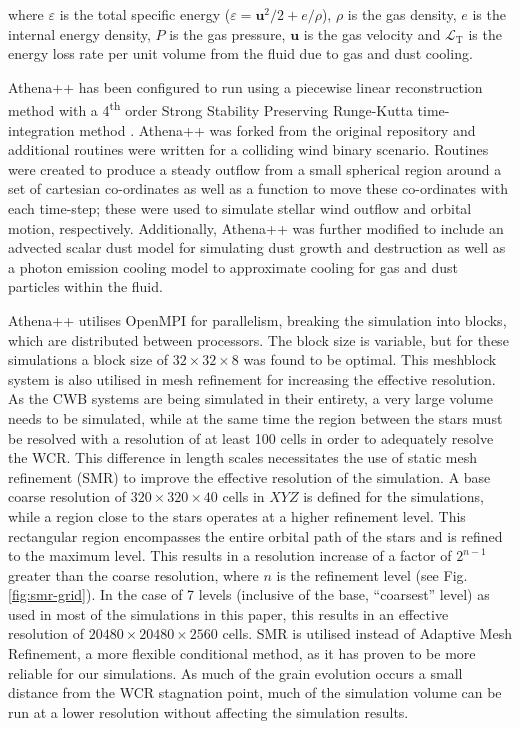 \documentclass[fleqn,usenatbib]{mnras}
\newcommand{\ts}{\textsuperscript}
\newcommand{\rms}[1]{\ensuremath{_{\text{#1}}}}
\begin{document}
\noindent
where $\varepsilon$ is the total specific energy ($\varepsilon = \boldsymbol{u}^2/2 + e/\rho $), $\rho$ is the gas density, $e$ is the internal energy density, $P$ is the gas pressure, $\boldsymbol{u}$ is the gas velocity and $\mathcal{L}\rms{T}$ is the energy loss rate per unit volume from the fluid due to gas and dust cooling.


Athena++ has been configured to run using a piecewise linear reconstruction method with a 4\ts{th} order Strong Stability Preserving Runge-Kutta time-integration method \citep{spiteriNewClassOptimal2002}.
Athena++ was forked from the original repository and additional routines were written for a colliding wind binary scenario.
Routines were created to produce a steady outflow from a small spherical region around a set of cartesian co-ordinates as well as a function to move these co-ordinates with each time-step; these were used to simulate stellar wind outflow and orbital motion, respectively.
Additionally, Athena++ was further modified to include an advected scalar dust model for simulating dust growth and destruction as well as a photon emission cooling model to approximate cooling for gas and dust particles within the fluid.

Athena++ utilises OpenMPI for parallelism, breaking the simulation into blocks, which are distributed between processors.
The block size is variable, but for these simulations a block size of $32\times 32 \times 8$ was found to be optimal.
This meshblock system is also utilised in mesh refinement for increasing the effective resolution.
As the CWB systems are being simulated in their entirety, a very large volume needs to be simulated, while at the same time the region between the stars must be resolved with a resolution of at least 100 cells in order to adequately resolve the WCR.
This difference in length scales necessitates the use of static mesh refinement (SMR) to improve the effective resolution of the simulation.
A base coarse resolution of $320 \times 320 \times 40$ cells in $XYZ$ is defined for the simulations, while a region close to the stars operates at a higher refinement level.
This rectangular region encompasses the entire orbital path of the stars and is refined to the maximum level.
This results in a resolution increase of a factor of $2^{n-1}$ greater than the coarse resolution, where $n$ is the refinement level (see Fig. \ref{fig:smr-grid}).
In the case of 7 levels (inclusive of the base, ``coarsest'' level) as used in most of the simulations in this paper, this results in an effective resolution of $20480 \times 20480 \times 2560$ cells.
SMR is utilised instead of Adaptive Mesh Refinement, a more flexible conditional method, as it has proven to be more reliable for our simulations.
As much of the grain evolution occurs a small distance from the WCR stagnation point, much of the simulation volume can be run at a lower resolution without affecting the simulation results.
\end{document}
